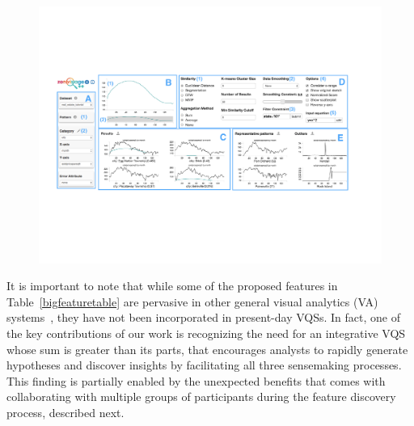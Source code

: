 {  %
  \begin{figure}[ht!]
    \centering
    \vspace{-5pt}
    \includegraphics[width=0.9\linewidth]{figures/zvpp_system.pdf} %
    \vspace{-5pt}\caption{}
    \label{zvOverview}
    \vspace*{-15pt}
  \end{figure}
  \par It is important to note that while some of the proposed features in Table~\ref{bigfeaturetable} are pervasive in other general visual analytics (VA) systems~\cite{Heer2012,Amar2005}, they have not been incorporated in present-day VQSs. In fact, one of the key contributions of our work is recognizing the need for an integrative VQS whose sum is greater than its parts, that encourages analysts to rapidly generate hypotheses and discover insights by facilitating all three sensemaking processes. This finding is partially enabled by the unexpected benefits that comes with collaborating with multiple groups of participants during the feature discovery process, described next.
}
